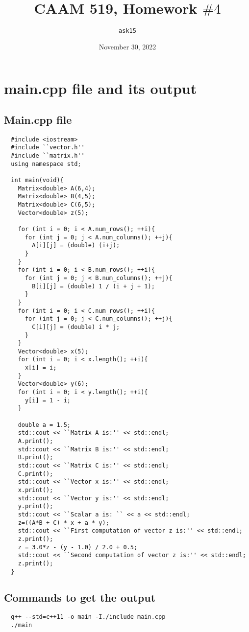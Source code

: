 \documentclass{article}
\title{CAAM 519, Homework $\#4$}
\author{\texttt{ask15}}
\date{November 30, 2022}
\begin{document}
\maketitle

\section{main.cpp file and its output}
\subsection{Main.cpp file}
\begin{lstlisting}
  #include <iostream>
  #include ``vector.h''
  #include ``matrix.h''
  using namespace std;

  int main(void){
    Matrix<double> A(6,4);
    Matrix<double> B(4,5);
    Matrix<double> C(6,5);
    Vector<double> z(5);

    for (int i = 0; i < A.num_rows(); ++i){
      for (int j = 0; j < A.num_columns(); ++j){
        A[i][j] = (double) (i+j);
      }
    }
    for (int i = 0; i < B.num_rows(); ++i){
      for (int j = 0; j < B.num_columns(); ++j){
        B[i][j] = (double) 1 / (i + j + 1);
      }
    }
    for (int i = 0; i < C.num_rows(); ++i){
      for (int j = 0; j < C.num_columns(); ++j){
        C[i][j] = (double) i * j;
      }
    }
    Vector<double> x(5);
    for (int i = 0; i < x.length(); ++i){
      x[i] = i;
    }
    Vector<double> y(6);
    for (int i = 0; i < y.length(); ++i){
      y[i] = 1 - i;
    }

    double a = 1.5;
    std::cout << ``Matrix A is:'' << std::endl;
    A.print();
    std::cout << ``Matrix B is:'' << std::endl;
    B.print();
    std::cout << ``Matrix C is:'' << std::endl;
    C.print();
    std::cout << ``Vector x is:'' << std::endl;
    x.print();
    std::cout << ``Vector y is:'' << std::endl;
    y.print();
    std::cout << ``Scalar a is: `` << a << std::endl;
    z=((A*B + C) * x + a * y);
    std::cout << ``First computation of vector z is:'' << std::endl;
    z.print();
    z = 3.0*z - (y - 1.0) / 2.0 + 0.5;
    std::cout << ``Second computation of vector z is:'' << std::endl;
    z.print();
  }
\end{lstlisting}
\subsection{Commands to get the output}
\begin{lstlisting}
  g++ --std=c++11 -o main -I./include main.cpp
  ./main
\end{lstlisting}
\end{document}
